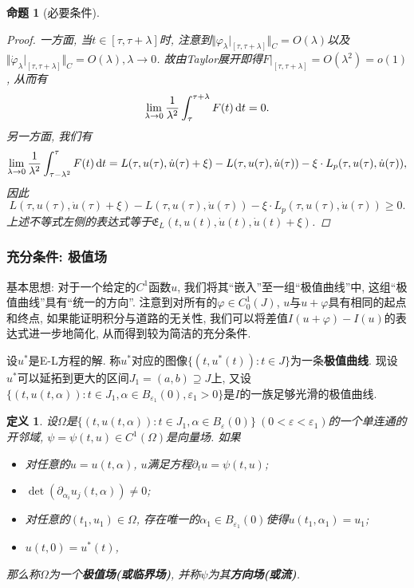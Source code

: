 \documentclass[12pt,a4paper]{article}
\newtheorem{definition}[theorem]{定义}
\newtheorem{proposition}[theorem]{命题}
\begin{document}
\begin{proposition}[必要条件]
\begin{proof}
    一方面, 当$t \in [\tau, \tau + \lambda]$时, 注意到$\Vert \varphi_{\lambda}|_{[\tau, \tau + \lambda]}\Vert_C = O(\lambda)$以及$\Vert \dot\varphi_{\lambda}|_{[\tau, \tau + \lambda]}\Vert_C = O(\lambda), \lambda \rightarrow 0$.
    故由Taylor展开即得$F|_{[\tau, \tau + \lambda]} = O(\lambda^2) = o(1)$, 从而有 
    \begin{equation*}
        \lim\limits_{\lambda \rightarrow 0}\frac{1}{\lambda^2}\int_{\tau}^{\tau + \lambda} F(t) \,{\rm d}t = 0.
    \end{equation*}
    另一方面, 我们有 
    \begin{equation*}
        \lim\limits_{\lambda \rightarrow 0}\frac{1}{\lambda^2}\int_{\tau - \lambda^2}^{\tau} F(t) \,{\rm d}t = L(\tau, u(\tau), \dot u(\tau) + \xi) - L(\tau, u(\tau), \dot u(\tau)) - \xi\cdot L_p(\tau, u(\tau), \dot u(\tau)),
    \end{equation*}
    因此
    \begin{equation*}
        L(\tau, u(\tau), \dot u(\tau) + \xi) - L(\tau, u(\tau), \dot u(\tau)) - \xi \cdot L_p(\tau, u(\tau), \dot u(\tau)) \geq 0. 
    \end{equation*}
    上述不等式左侧的表达式等于$\mathfrak{E}_L(t, u(t), \dot u(t), \dot u(t) + \xi)$. 
    \end{proof}
\end{proposition}

\subsubsection{充分条件: 极值场}

基本思想: 对于一个给定的$C^1$函数$u$, 我们将其``嵌入''至一组``极值曲线''中, 这组``极值曲线''具有``统一的方向''.
注意到对所有的$\varphi \in C_0^1(J)$, $u$与$u + \varphi$具有相同的起点和终点, 如果能证明积分与道路的无关性, 我们可以将差值$I(u + \varphi) - I(u)$的表达式进一步地简化, 从而得到较为简洁的充分条件.

设$u^*$是E-L方程的解. 称$u^*$对应的图像$\{(t, u^*(t)) \colon t \in J\}$为一条\textbf{极值曲线}.
现设$u^*$可以延拓到更大的区间$J_1 = (a, b) \supseteq J$上, 又设$\{(t, u(t, \alpha))\colon t \in J_1, \alpha \in B_{\varepsilon_1}(0), \varepsilon_1 > 0\}$是$I$的一族足够光滑的极值曲线.

\begin{definition}
    设$\Omega$是$\{(t, u(t, \alpha))\colon t \in J_1, \alpha \in B_{\varepsilon}(0)\} \ (0 < \varepsilon < \varepsilon_1)$的一个单连通的开邻域, $\psi = \psi(t, u) \in C^1(\Omega)$是向量场.
    如果 
    \begin{itemize}
        \item 对任意的$u = u(t, \alpha)$, $u$满足方程$\partial_tu = \psi(t, u)$;
        \item $\det (\partial_{\alpha_i}u_j(t, \alpha)) \neq 0$;
        \item 对任意的$(t_1, u_1) \in \Omega$, 存在唯一的$\alpha_1 \in B_{\varepsilon_1}(0)$使得$u(t_1, \alpha_1) = u_1$;
        \item $u(t, 0) = u^*(t)$,
    \end{itemize}
    那么称$\Omega$为一个\textbf{极值场(或临界场)}, 并称$\psi$为其\textbf{方向场(或流)}.
\end{definition}
\end{document}
